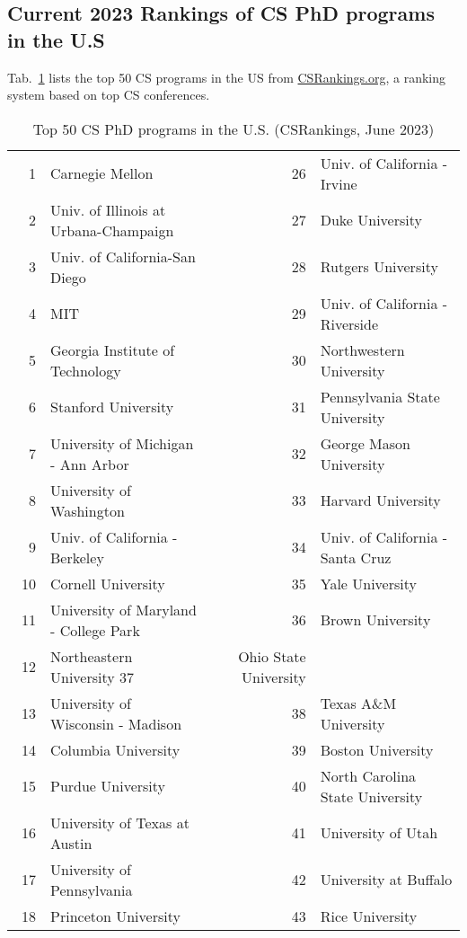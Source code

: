 \documentclass[11pt]{article}
\begin{document}
\subsection{Current 2023 Rankings of CS PhD programs in the U.S}\label{sec:ranking}
  Tab.~\ref{tab:ranking} lists the top 50 CS programs in the US from \href{https://www.csrankings.org}{CSRankings.org}, a ranking system  based on top CS conferences.
  
  \begin{table}[h!]
    \centering
    \small
    \caption{Top 50 CS PhD programs in the U.S. (CSRankings, June 2023)}\label{tab:ranking}
  \begin{tabular}{rl|rl}
    \toprule
    1 & Carnegie Mellon & 26 & Univ. of California - Irvine \\
    2 & Univ. of Illinois at Urbana-Champaign  & 27 &  Duke University \\
    3 & Univ. of California-San Diego & 28 & Rutgers University \\
    4 & MIT & 29 & Univ. of California - Riverside\\
    5 & Georgia Institute of Technology         & 30 & Northwestern University\\
    6 & Stanford University& 31 & Pennsylvania State University  \\
    7 & University of Michigan - Ann Arbor   & 32& George Mason University\\  
    8 & University of Washington      &33 &  Harvard University \\
    9 &  Univ. of California - Berkeley  &34&  Univ. of California - Santa Cruz \\
    10 & Cornell University  & 35 &  Yale University \\
    11 & University of Maryland - College Park &  36& Brown University \\ 
    12 & Northeastern University 37&  Ohio State University\\
    13 & University of Wisconsin - Madison  &38& Texas A\&M University \\
    14 & Columbia University   &39 & Boston University  \\
    15 &   Purdue University  &40& North Carolina State University\\\  
    16 & University of Texas at Austin   &41 & University of Utah \\
    17 & University of Pennsylvania &42 & University at Buffalo\\
    18 & Princeton University  & 43& Rice University\\

\end{tabular}
\end{table}
\end{document}
